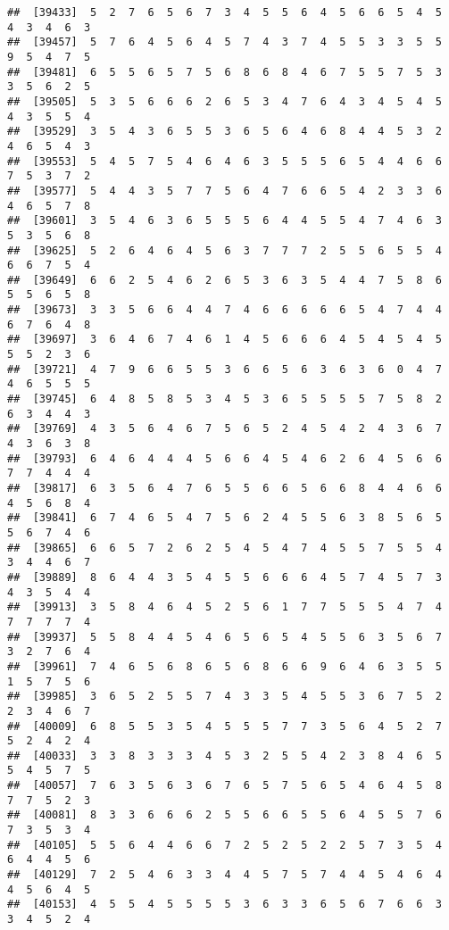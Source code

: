 \documentclass[
]{book}
\begin{document}
\begin{verbatim}
##  [39433]  5  2  7  6  5  6  7  3  4  5  5  6  4  5  6  6  5  4  5  4  3  4  6  3
##  [39457]  5  7  6  4  5  6  4  5  7  4  3  7  4  5  5  3  3  5  5  9  5  4  7  5
##  [39481]  6  5  5  6  5  7  5  6  8  6  8  4  6  7  5  5  7  5  3  3  5  6  2  5
##  [39505]  5  3  5  6  6  6  2  6  5  3  4  7  6  4  3  4  5  4  5  4  3  5  5  4
##  [39529]  3  5  4  3  6  5  5  3  6  5  6  4  6  8  4  4  5  3  2  4  6  5  4  3
##  [39553]  5  4  5  7  5  4  6  4  6  3  5  5  5  6  5  4  4  6  6  7  5  3  7  2
##  [39577]  5  4  4  3  5  7  7  5  6  4  7  6  6  5  4  2  3  3  6  4  6  5  7  8
##  [39601]  3  5  4  6  3  6  5  5  5  6  4  4  5  5  4  7  4  6  3  5  3  5  6  8
##  [39625]  5  2  6  4  6  4  5  6  3  7  7  7  2  5  5  6  5  5  4  6  6  7  5  4
##  [39649]  6  6  2  5  4  6  2  6  5  3  6  3  5  4  4  7  5  8  6  5  5  6  5  8
##  [39673]  3  3  5  6  6  4  4  7  4  6  6  6  6  6  5  4  7  4  4  6  7  6  4  8
##  [39697]  3  6  4  6  7  4  6  1  4  5  6  6  6  4  5  4  5  4  5  5  5  2  3  6
##  [39721]  4  7  9  6  6  5  5  3  6  6  5  6  3  6  3  6  0  4  7  4  6  5  5  5
##  [39745]  6  4  8  5  8  5  3  4  5  3  6  5  5  5  5  7  5  8  2  6  3  4  4  3
##  [39769]  4  3  5  6  4  6  7  5  6  5  2  4  5  4  2  4  3  6  7  4  3  6  3  8
##  [39793]  6  4  6  4  4  4  5  6  6  4  5  4  6  2  6  4  5  6  6  7  7  4  4  4
##  [39817]  6  3  5  6  4  7  6  5  5  6  6  5  6  6  8  4  4  6  6  4  5  6  8  4
##  [39841]  6  7  4  6  5  4  7  5  6  2  4  5  5  6  3  8  5  6  5  5  6  7  4  6
##  [39865]  6  6  5  7  2  6  2  5  4  5  4  7  4  5  5  7  5  5  4  3  4  4  6  7
##  [39889]  8  6  4  4  3  5  4  5  5  6  6  6  4  5  7  4  5  7  3  4  3  5  4  4
##  [39913]  3  5  8  4  6  4  5  2  5  6  1  7  7  5  5  5  4  7  4  7  7  7  7  4
##  [39937]  5  5  8  4  4  5  4  6  5  6  5  4  5  5  6  3  5  6  7  3  2  7  6  4
##  [39961]  7  4  6  5  6  8  6  5  6  8  6  6  9  6  4  6  3  5  5  1  5  7  5  6
##  [39985]  3  6  5  2  5  5  7  4  3  3  5  4  5  5  3  6  7  5  2  2  3  4  6  7
##  [40009]  6  8  5  5  3  5  4  5  5  5  7  7  3  5  6  4  5  2  7  5  2  4  2  4
##  [40033]  3  3  8  3  3  3  4  5  3  2  5  5  4  2  3  8  4  6  5  5  4  5  7  5
##  [40057]  7  6  3  5  6  3  6  7  6  5  7  5  6  5  4  6  4  5  8  7  7  5  2  3
##  [40081]  8  3  3  6  6  6  2  5  5  6  6  5  5  6  4  5  5  7  6  7  3  5  3  4
##  [40105]  5  5  6  4  4  6  6  7  2  5  2  5  2  2  5  7  3  5  4  6  4  4  5  6
##  [40129]  7  2  5  4  6  3  3  4  4  5  7  5  7  4  4  5  4  6  4  4  5  6  4  5
##  [40153]  4  5  5  4  5  5  5  5  3  6  3  3  6  5  6  7  6  6  3  3  4  5  2  4

\end{verbatim}
\end{document}
